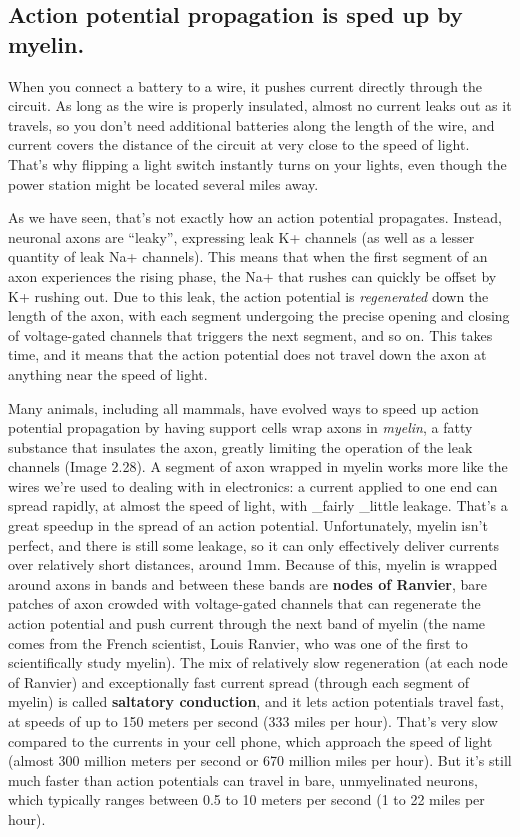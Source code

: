 \documentclass[
]{book}
\begin{document}
\hypertarget{action-potential-propagation-is-sped-up-by-myelin.}{%
\subsection{Action potential propagation is sped up by myelin.}\label{action-potential-propagation-is-sped-up-by-myelin.}}

When you connect a battery to a wire, it pushes current directly through the circuit. As long as the wire is properly insulated, almost no current leaks out as it travels, so you don't need additional batteries along the length of the wire, and current covers the distance of the circuit at very close to the speed of light. That's why flipping a light switch instantly turns on your lights, even though the power station might be located several miles away.

As we have seen, that's not exactly how an action potential propagates. Instead, neuronal axons are ``leaky'', expressing leak K+ channels (as well as a lesser quantity of leak Na+ channels). This means that when the first segment of an axon experiences the rising phase, the Na+ that rushes can quickly be offset by K+ rushing out. Due to this leak, the action potential is \emph{regenerated} down the length of the axon, with each segment undergoing the precise opening and closing of voltage-gated channels that triggers the next segment, and so on. This takes time, and it means that the action potential does not travel down the axon at anything near the speed of light.

Many animals, including all mammals, have evolved ways to speed up action potential propagation by having support cells wrap axons in \emph{myelin}, a fatty substance that insulates the axon, greatly limiting the operation of the leak channels (Image 2.28). A segment of axon wrapped in myelin works more like the wires we're used to dealing with in electronics: a current applied to one end can spread rapidly, at almost the speed of light, with \_fairly \_little leakage. That's a great speedup in the spread of an action potential. Unfortunately, myelin isn't perfect, and there is still some leakage, so it can only effectively deliver currents over relatively short distances, around 1mm. Because of this, myelin is wrapped around axons in bands and between these bands are \textbf{nodes of Ranvier}, bare patches of axon crowded with voltage-gated channels that can regenerate the action potential and push current through the next band of myelin (the name comes from the French scientist, Louis Ranvier, who was one of the first to scientifically study myelin). The mix of relatively slow regeneration (at each node of Ranvier) and exceptionally fast current spread (through each segment of myelin) is called \textbf{saltatory conduction}, and it lets action potentials travel fast, at speeds of up to 150 meters per second (333 miles per hour). That's very slow compared to the currents in your cell phone, which approach the speed of light (almost 300 million meters per second or 670 million miles per hour). But it's still much faster than action potentials can travel in bare, unmyelinated neurons, which typically ranges between 0.5 to 10 meters per second (1 to 22 miles per hour).
\end{document}
